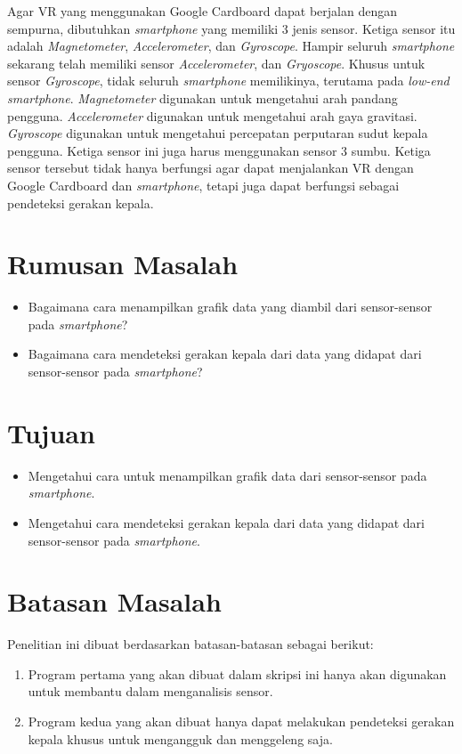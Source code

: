 Agar VR yang menggunakan Google Cardboard dapat berjalan dengan sempurna, dibutuhkan \textit{smartphone} yang memiliki 3 jenis sensor. Ketiga sensor itu adalah \textit{Magnetometer}, \textit{Accelerometer}, dan \textit{Gyroscope}.\cite{android_open_source_project} Hampir seluruh \textit{smartphone} sekarang telah memiliki sensor \textit{Accelerometer}, dan \textit{Gryoscope}. Khusus untuk sensor \textit{Gyroscope}, tidak seluruh \textit{smartphone} memilikinya, terutama pada \textit{low-end smartphone}. \textit{Magnetometer} digunakan untuk mengetahui arah pandang pengguna. \textit{Accelerometer} digunakan untuk mengetahui arah gaya gravitasi.\cite{bleser2009advanced} \textit{Gyroscope} digunakan untuk mengetahui percepatan perputaran sudut kepala pengguna. Ketiga sensor ini juga harus menggunakan sensor 3 sumbu. Ketiga sensor tersebut tidak hanya berfungsi agar dapat menjalankan VR dengan Google Cardboard dan \textit{smartphone}, tetapi juga dapat berfungsi sebagai pendeteksi gerakan kepala.
\section{Rumusan Masalah}

\begin{itemize}
	\item Bagaimana cara menampilkan grafik data yang diambil dari sensor-sensor pada \textit{smartphone}?
	\item Bagaimana cara mendeteksi gerakan kepala dari data yang didapat dari sensor-sensor pada \textit{smartphone}?
\end{itemize}

\section{Tujuan}

\begin{itemize}
	\item Mengetahui cara untuk menampilkan grafik data dari sensor-sensor pada \textit{smartphone}.
	\item Mengetahui cara mendeteksi gerakan kepala dari data yang didapat dari sensor-sensor pada \textit{smartphone}.
\end{itemize}

\section{Batasan Masalah}

Penelitian ini dibuat berdasarkan batasan-batasan sebagai berikut: 
\begin{enumerate}
	\item Program pertama yang akan dibuat dalam skripsi ini hanya akan digunakan untuk membantu dalam menganalisis sensor.
	\item Program kedua yang akan dibuat hanya dapat melakukan pendeteksi gerakan kepala khusus untuk mengangguk dan menggeleng saja.
\end{enumerate}

